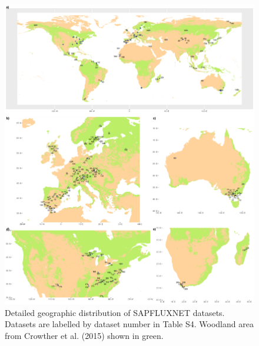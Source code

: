 \documentclass[11pt,twoside]{reedthesis}
\begin{document}
\setlength{\abovecaptionskip}{15pt}
\begin{figure}
\includegraphics[width=1\linewidth]{figure/appendixB/regionalmaps} \caption[Detailed geographic distribution of SAPFLUXNET datasets]{Detailed geographic distribution of SAPFLUXNET datasets. Datasets are labelled by dataset number in Table S4. Woodland area from Crowther et al. (2015) shown in green.}\label{fig:regionalmaps}
\end{figure}
\setlength{\abovecaptionskip}{0pt}
\end{document}
